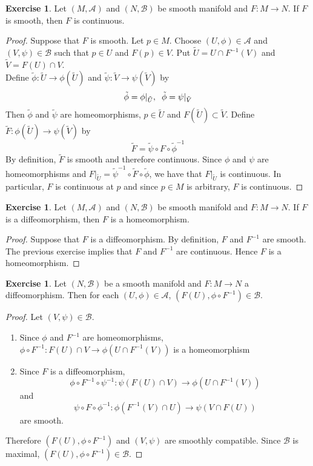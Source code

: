 \documentclass{book}
\theoremstyle{definition}
\newtheorem{ex}[definition]{Exercise}
\newcommand{\MA}{\mathcal{A}}
\newcommand{\MB}{\mathcal{B}}
\newcommand{\tU}{\tilde{U}}
\newcommand{\tV}{\tilde{V}}
\newcommand{\tphi}{\tilde{\phi}}
\newcommand{\tpsi}{\tilde{\psi}}
\newcommand{\tF}{\tilde{F}}
\DeclareMathOperator*{\0}{\mbf{0}}
\DeclareMathOperator*{\1}{\mbf{1}}
\begin{document}
	\begin{ex}
	Let $(M, \MA)$ and $(N, \MB)$ be smooth manifold and $F: M \rightarrow N$. If $F$ is smooth, then $F$ is continuous. 
	\end{ex}
	
	\begin{proof}
	Suppose that $F$ is smooth. Let $p \in M$. Choose $(U, \phi) \in \MA$ and $(V, \psi) \in \MB$ such that $p \in U$ and $F(p) \in V$. Put $\tU = U \cap F^{-1}(V)$ and $\tV = F(U) \cap V$. \\
	Define $\tphi: \tU \rightarrow \phi(\tU)$ and $\tpsi: \tV \rightarrow \psi(\tV)$ by $$\tphi = \phi|_{\tU}, \hspace{.2cm} \tphi = \psi|_{\tV}$$ Then $\tphi$ and $\tpsi$ are homeomorphisms, $p \in \tU$ and $F(\tU) \subset \tV$. Define $\tF: \phi(\tU) \rightarrow \psi(\tV) $ by $$ \tF = \tpsi \circ F \circ \tphi^{-1}$$  
	By definition, $\tF$ is smooth and therefore continuous. Since $\phi$ and $\psi$ are homeomorphisms and $F|_{\tU} = \tpsi^{-1} \circ \tF \circ \tphi$, we have that $F|_{\tU}$ is continuous. In particular, $F$ is continuous at $p$ and since $p \in M$ is arbitrary, $F$ is continuous.
	\end{proof}
	
	\begin{ex}
	Let $(M, \MA)$ and $(N, \MB)$ be smooth manifold and $F: M \rightarrow N$. If $F$ is a diffeomorphism, then $F$ is a homeomorphism. 
	\end{ex}	
	
	\begin{proof}
	Suppose that $F$ is a diffeomorphism. By definition, $F$ and  $F^{-1}$ are smooth. The previous exercise implies that $F$ and $F^{-1}$ are continuous. Hence $F$  is a homeomorphism. 
	\end{proof}
	
	\begin{ex}
		Let $(N, \MB)$ be a smooth manifold and $F: M \rightarrow N$ a diffeomorphism. Then for each $(U, \phi) \in \MA$, $(F(U), \phi \circ F^{-1}) \in \MB$.
	\end{ex}
	
	\begin{proof}
		Let $(V, \psi) \in \MB$. 
		\begin{enumerate}
		\item Since $\phi$ and $F^{-1}$ are homeomorphisms, $\phi \circ F^{-1}: F(U) \cap V \rightarrow \phi(U \cap F^{-1}(V))$ is a homeomorphism
		\item Since $F$ is a diffeomorphism, $$\phi \circ F^{-1} \circ \psi^{-1}: \psi(F(U) \cap V) \rightarrow \phi(U \cap F^{-1}(V))$$ and $$\psi \circ F \circ \phi^{-1}: \phi(F^{-1}(V) \cap U) \rightarrow \psi(V \cap F(U))$$ are smooth. 
		\end{enumerate}
		
		Therefore $(F(U), \phi \circ F^{-1})$ and $(V, \psi)$ are smoothly compatible. Since $\MB$ is maximal, $(F(U), \phi \circ F^{-1}) \in \MB$.
	\end{proof}
\end{document}
